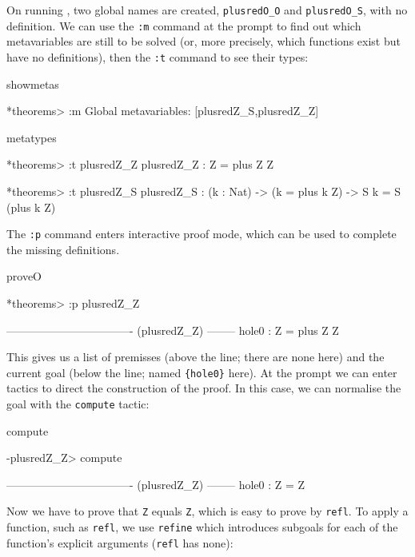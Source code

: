 \noindent
On running \Idris{}, two global names are created, \texttt{plusredO\_O} and
\texttt{plusredO\_S}, with no definition. We can use the \texttt{:m} command
at the prompt to find out which metavariables are still to be solved (or, more
precisely, which functions exist but have no definitions), then the
\texttt{:t} command to see their types:

\begin{SaveVerbatim}{showmetas}

*theorems> :m 
Global metavariables:
        [plusredZ_S,plusredZ_Z]

\end{SaveVerbatim}

\begin{SaveVerbatim}{metatypes}

*theorems> :t plusredZ_Z
plusredZ_Z : Z = plus Z Z

*theorems> :t plusredZ_S
plusredZ_S : (k : Nat) -> (k = plus k Z) -> S k = S (plus k Z)

\end{SaveVerbatim}


\noindent
The \texttt{:p} command enters interactive proof mode, which can be used to complete
the missing definitions.

\begin{SaveVerbatim}{proveO}

*theorems> :p plusredZ_Z

---------------------------------- (plusredZ_Z) --------
{hole0} : Z = plus Z Z

\end{SaveVerbatim}

\noindent
This gives us a list of premisses 
(above the line; there are none here) and the current goal (below the line;
named \texttt{\{hole0\}} here).
At the prompt we can enter tactics to direct the construction of the proof. In this case,
we can normalise the goal with the \texttt{compute} tactic:

\begin{SaveVerbatim}{compute}

-plusredZ_Z> compute

---------------------------------- (plusredZ_Z) --------
{hole0} : Z = Z

\end{SaveVerbatim}

\noindent
Now we have to prove that \texttt{Z} equals \texttt{Z}, which is easy to prove by
\texttt{refl}. To apply a function, such as \texttt{refl}, we use \texttt{refine} 
which introduces subgoals for each of the function's explicit arguments (\texttt{refl}
has none):

